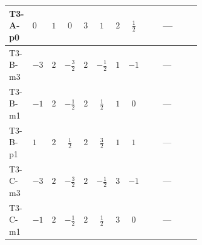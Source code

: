 \documentclass[8pt]{article}
\begin{document}
\begin{landscape}
\begin{longtable}{@{}llcccccc >{\raggedright\arraybackslash}p{0.21\linewidth} >{\raggedright\arraybackslash}p{0.21\linewidth} >{\raggedright\arraybackslash}p{0.21\linewidth}@{}}
\midrule
T3-A-p0 & $0$ & $1$ & $0$ & $3$ & $1$ & $2$ & $\frac{1}{2}$ & \scriptsize\adjustbox{max width=\linewidth}{$\begin{gathered} -12 {g_2}^2 {\lambda_{12}^{(1)}}\end{gathered}$} & --- & \scriptsize\adjustbox{max width=\linewidth}{$\begin{gathered} -6 {g_1}^2 {\lambda_{12}^{(1)}}\end{gathered}$} \\
\midrule
T3-B-m3 & $-3$ & $2$ & $-\frac{3}{2}$ & $2$ & $-\frac{1}{2}$ & $1$ & $-1$ & \scriptsize\adjustbox{max width=\linewidth}{$\begin{gathered} -9 {g_2}^2 {\lambda_{12}^{(1)}}\end{gathered}$} & --- & \scriptsize\adjustbox{max width=\linewidth}{$\begin{gathered} -15 {g_1}^2 {\lambda_{12}^{(1)}}\end{gathered}$} \\
\midrule
T3-B-m1 & $-1$ & $2$ & $-\frac{1}{2}$ & $2$ & $\frac{1}{2}$ & $1$ & $0$ & \scriptsize\adjustbox{max width=\linewidth}{$\begin{gathered} -9 {g_2}^2 {\lambda_{12}^{(1)}}\end{gathered}$} & --- & \scriptsize\adjustbox{max width=\linewidth}{$\begin{gathered} -3 {g_1}^2 {\lambda_{12}^{(1)}}\end{gathered}$} \\
\midrule
T3-B-p1 & $1$ & $2$ & $\frac{1}{2}$ & $2$ & $\frac{3}{2}$ & $1$ & $1$ & \scriptsize\adjustbox{max width=\linewidth}{$\begin{gathered} -9 {g_2}^2 {\lambda_{12}^{(1)}}\end{gathered}$} & --- & \scriptsize\adjustbox{max width=\linewidth}{$\begin{gathered} -15 {g_1}^2 {\lambda_{12}^{(1)}}\end{gathered}$} \\
\midrule
T3-C-m3 & $-3$ & $2$ & $-\frac{3}{2}$ & $2$ & $-\frac{1}{2}$ & $3$ & $-1$ & \scriptsize\adjustbox{max width=\linewidth}{$\begin{gathered} -9 {g_2}^2 {\lambda_{12}^{(1)}}\end{gathered}$} & --- & \scriptsize\adjustbox{max width=\linewidth}{$\begin{gathered} -15 {g_1}^2 {\lambda_{12}^{(1)}}\end{gathered}$} \\
\midrule
T3-C-m1 & $-1$ & $2$ & $-\frac{1}{2}$ & $2$ & $\frac{1}{2}$ & $3$ & $0$ & \scriptsize\adjustbox{max width=\linewidth}{$\begin{gathered} -9 {g_2}^2 {\lambda_{12}^{(1)}}\end{gathered}$} & --- & \scriptsize\adjustbox{max width=\linewidth}{$\begin{gathered} -3 {g_1}^2 {\lambda_{12}^{(1)}}\end{gathered}$} \\

\end{longtable}
\end{landscape}
\end{document}
